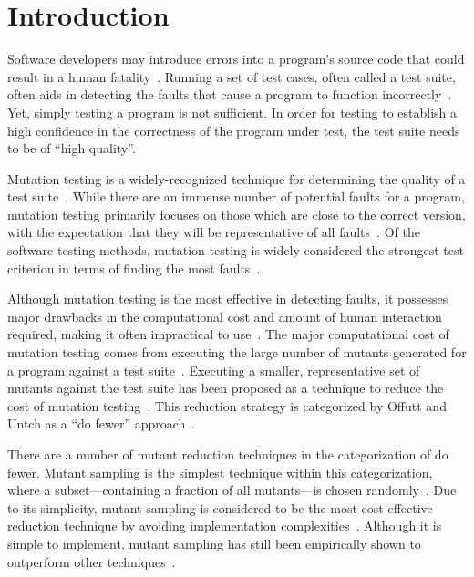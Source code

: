 
\section{Introduction}


Software developers may introduce errors into a program's source code that could result in a human
fatality~\cite{vicente2003programming}. Running a set of test cases, often called a test suite, often aids in detecting
the faults that cause a program to function incorrectly~\cite{wagner2005comparing}. Yet, simply testing a program is not
sufficient. In order for testing to establish a high confidence in the correctness of the program under test, the test
suite needs to be of ``high quality''.

Mutation testing is a widely-recognized technique for determining the quality of a test
suite~\cite{gopinath2015mutation}. While there are an immense number of potential faults for a program, mutation testing
primarily focuses on those which are close to the correct version, with the expectation that they will be representative
of all faults~\cite{jia2011analysis}.  Of the software testing methods, mutation testing is widely considered the
strongest test criterion in terms of finding the most faults~\cite{ammann2008introduction}.

Although mutation testing is the most effective in detecting faults, it possesses major drawbacks in the computational
cost and amount of human interaction required, making it often impractical to use~\cite{gopinath2015mutation,
wong1995reducing, gopinath2015empirical}.  The major computational cost of mutation testing comes from executing the
large number of mutants generated for a program against a test suite~\cite{offutt1993experimental}. Executing a smaller,
representative set of mutants against the test suite has been proposed as a technique to reduce the cost of mutation
testing~\cite{jia2011analysis, wong1995reducing, offutt1993experimental, offutt2001mutation}.  This reduction strategy
is categorized by Offutt and Untch as a ``do fewer'' approach~\cite{offutt2001mutation}.

There are a number of mutant reduction techniques in the categorization of do fewer.  Mutant sampling is the simplest
technique within this categorization, where a subset---containing a fraction of all mutants---is chosen
randomly~\cite{wong1995reducing}.  Due to its simplicity, mutant sampling is considered to be the most cost-effective
reduction technique by avoiding implementation complexities~\cite{gopinath2015mutation}.  Although it is simple to
implement, mutant sampling has still been empirically shown to outperform other techniques~\cite{zhang2010operator}.

